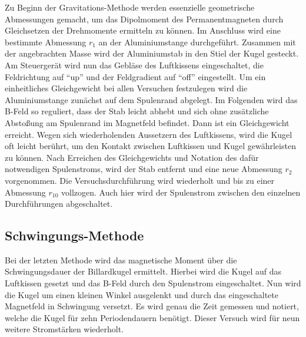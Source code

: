 \noindent Zu Beginn der Gravitations-Methode werden essenzielle geometrische Abmessungen gemacht, um das Dipolmoment des 
Permanentmagneten durch Gleichsetzen der Drehmomente ermitteln zu können. Im Anschluss wird eine bestimmte Abmessung $r_1$ 
an der Aluminiumstange durchgeführt. Zusammen mit der angebrachten Masse wird der Aluminiumstab in den Stiel der Kugel gesteckt. 
Am Steuergerät wird nun das Gebläse des Luftkissens eingeschaltet, die Feldrichtung auf \enquote{up} und der Feldgradient auf 
\enquote{off} eingestellt. Um ein einheitliches Gleichgewicht bei allen Versuchen festzulegen wird die Aluminiumstange zunächst auf 
dem Spulenrand abgelegt. Im Folgenden wird das B-Feld so reguliert, dass der Stab leicht abhebt und sich ohne zusätzliche 
Abstoßung am Spulenrand im Magnetfeld befindet. Dann ist ein Gleichgewicht erreicht. Wegen sich wiederholenden Aussetzern des 
Luftkissens, wird die Kugel oft leicht berührt, um den Kontakt zwischen Luftkissen und Kugel gewährleisten zu können.
Nach Erreichen des Gleichgewichts und Notation des dafür notwendigen Spulenstroms, wird der Stab entfernt und eine neue Abmessung 
$r_2$ vorgenommen. Die Versuchsdurchführung wird wiederholt und bis zu einer Abmessung $r_{10}$ vollzogen. Auch hier wird der 
Spulenstrom zwischen den einzelnen Durchführungen abgeschaltet.

\subsection{Schwingungs-Methode}

\noindent Bei der letzten Methode wird das magnetische Moment über die Schwingungsdauer der Billardkugel ermittelt. Hierbei wird
die Kugel auf das Luftkissen gesetzt und das B-Feld durch den Spulenstrom eingeschaltet. Nun wird die Kugel um einen kleinen Winkel 
ausgelenkt und durch das eingeschaltete Magnetfeld in Schwingung versetzt. Es wird genau die Zeit gemessen und notiert, welche 
die Kugel für zehn Periodendauern benötigt. Dieser Versuch wird für neun weitere Stromstärken wiederholt.

%

